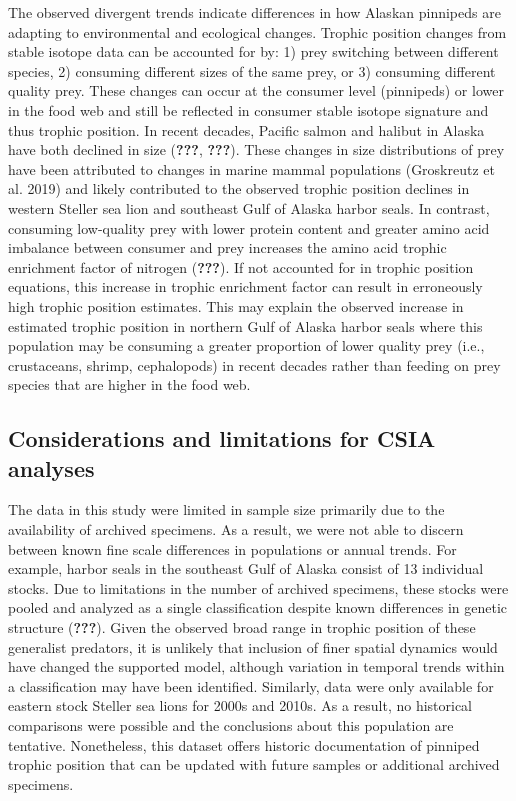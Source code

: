 \documentclass [11pt, proquest] {uwthesis}[2015/03/03]
\begin{document}
The observed divergent trends indicate differences in how Alaskan
pinnipeds are adapting to environmental and ecological changes. Trophic
position changes from stable isotope data can be accounted for by: 1)
prey switching between different species, 2) consuming different sizes
of the same prey, or 3) consuming different quality prey. These changes
can occur at the consumer level (pinnipeds) or lower in the food web and
still be reflected in consumer stable isotope signature and thus trophic
position. In recent decades, Pacific salmon and halibut in Alaska have
both declined in size ({\textbf{???}}, {\textbf{???}}). These changes in
size distributions of prey have been attributed to changes in marine
mammal populations (Groskreutz et al. 2019) and likely contributed to
the observed trophic position declines in western Steller sea lion and
southeast Gulf of Alaska harbor seals. In contrast, consuming
low-quality prey with lower protein content and greater amino acid
imbalance between consumer and prey increases the amino acid trophic
enrichment factor of nitrogen ({\textbf{???}}). If not accounted for in
trophic position equations, this increase in trophic enrichment factor
can result in erroneously high trophic position estimates. This may
explain the observed increase in estimated trophic position in northern
Gulf of Alaska harbor seals where this population may be consuming a
greater proportion of lower quality prey (i.e., crustaceans, shrimp,
cephalopods) in recent decades rather than feeding on prey species that
are higher in the food web.

\subsection{Considerations and limitations for CSIA
analyses}\label{considerations-and-limitations-for-csia-analyses}

The data in this study were limited in sample size primarily due to the
availability of archived specimens. As a result, we were not able to
discern between known fine scale differences in populations or annual
trends. For example, harbor seals in the southeast Gulf of Alaska
consist of 13 individual stocks. Due to limitations in the number of
archived specimens, these stocks were pooled and analyzed as a single
classification despite known differences in genetic structure
({\textbf{???}}). Given the observed broad range in trophic position of
these generalist predators, it is unlikely that inclusion of finer
spatial dynamics would have changed the supported model, although
variation in temporal trends within a classification may have been
identified. Similarly, data were only available for eastern stock
Steller sea lions for 2000s and 2010s. As a result, no historical
comparisons were possible and the conclusions about this population are
tentative. Nonetheless, this dataset offers historic documentation of
pinniped trophic position that can be updated with future samples or
additional archived specimens.
\end{document}
